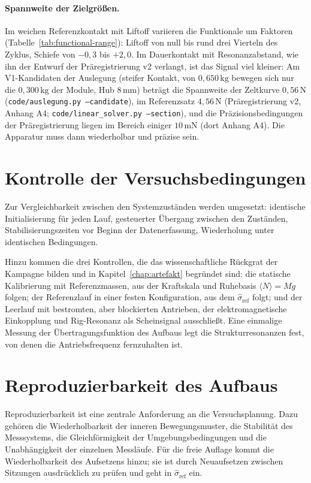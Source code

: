 \documentclass[12pt,a4paper]{report}
\begin{document}
\paragraph{Spannweite der Zielgrößen.}
Im weichen Referenzkontakt mit Liftoff variieren die Funktionale um
Faktoren (Tabelle~\ref{tab:functional-range}): Liftoff von null bis rund
drei Vierteln des Zyklus, Schiefe von $-0{,}3$ bis $+2{,}0$. Im
Dauerkontakt mit Resonanzabstand, wie ihn der Entwurf der
Präregistrierung v2 verlangt, ist das Signal viel kleiner: Am
V1-Kandidaten der Auslegung (steifer Kontakt, von $0{,}650\,\mathrm{kg}$
bewegen sich nur die $0{,}300\,\mathrm{kg}$ der Module, Hub
$8\,\mathrm{mm}$) beträgt die Spannweite der Zeltkurve
$0{,}56\,\mathrm{N}$ (\texttt{code/auslegung.py --candidate}), im
Referenzsatz $4{,}56\,\mathrm{N}$ (Präregistrierung v2, Anhang A4;
\texttt{code/linear\_solver.py --section}), und die Präzisionsbedingungen
der Präregistrierung liegen im Bereich einiger $10\,\mathrm{mN}$ (dort
Anhang A4). Die Apparatur muss dann wiederholbar und präzise sein.

\section{Kontrolle der Versuchsbedingungen}

Zur Vergleichbarkeit zwischen den Systemzuständen werden umgesetzt:
identische Initialisierung für jeden Lauf, gesteuerter Übergang zwischen
den Zuständen, Stabilisierungszeiten vor Beginn der Datenerfassung,
Wiederholung unter identischen Bedingungen.

Hinzu kommen die drei Kontrollen, die das wissenschaftliche Rückgrat der
Kampagne bilden und in Kapitel~\ref{chap:artefakt} begründet sind: die
statische Kalibrierung mit Referenzmassen, aus der Kraftskala und
Ruhebasis $\langle N \rangle = Mg$ folgen; der Referenzlauf in einer
festen Konfiguration, aus dem $\hat{\sigma}_{\mathrm{ref}}$ folgt; und
der Leerlauf mit bestromten, aber blockierten Antrieben, der
elektromagnetische Einkopplung und Rig-Resonanz als Scheinsignal
ausschließt. Eine einmalige Messung der Übertragungsfunktion des Aufbaus
legt die Strukturresonanzen fest, von denen die Antriebsfrequenz
fernzuhalten ist.

\section{Reproduzierbarkeit des Aufbaus}

Reproduzierbarkeit ist eine zentrale Anforderung an die Versuchsplanung.
Dazu gehören die Wiederholbarkeit der inneren Bewegungsmuster, die
Stabilität des Messsystems, die Gleichförmigkeit der
Umgebungsbedingungen und die Unabhängigkeit der einzelnen Messläufe.
Für die freie Auflage kommt die Wiederholbarkeit des Aufsetzens hinzu;
sie ist durch Neuaufsetzen zwischen Sitzungen ausdrücklich zu prüfen und
geht in $\hat{\sigma}_{\mathrm{ref}}$ ein.
\end{document}
